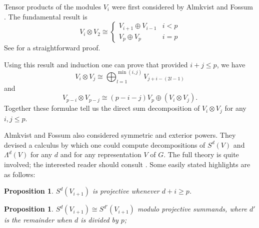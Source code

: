 \documentclass[a4paper]{amsart}
\newtheorem{Proposition}[Lemma]{Proposition}
\theoremstyle{definition}
\theoremstyle{remark}
\theoremstyle{Acknowledgments}
\begin{document}
Tensor products of the modules $V_i$ were first considered by Almkvist and Fossum \cite{AlmkvistFossum}. The fundamental result is
\begin{equation}\label{tensorbyV2} V_i \otimes V_2 \cong \left\{ \begin{array}{lr} V_{i+1} \oplus V_{i-1}&  i<p\\ V_p \oplus V_p & i=p \end{array} \right.  
\end{equation}
See \cite[Lemma~2.3.1]{BensonVecBook} for a straightforward proof. 

Using this result and induction one can prove that provided $i+j \leq p$, we have
\begin{equation}\label{tensorbyVj} V_i \otimes V_j \cong \bigoplus_{l=1}^{\min(i,j)} V_{j+i-(2l-1)}\end{equation} and
\begin{equation}\label{tensorbyVp-j} V_{p-i} \otimes V_{p-j} \cong (p-i-j) V_p \oplus (V_i \otimes V_j).\end{equation} 
Together these formulae tell us the direct sum decomposition of $V_i \otimes V_j$ for any $i,j \leq p$.

Almkvist and Fossum also considered symmetric and exterior powers. They devised a calculus by which one could compute decompositions of $S^d(V)$ and $\Lambda^d(V)$ for any $d$ and for any representation $V$ of $G$. The full theory is quite involved; the interested reader should consult \cite[Section~2.8]{BensonVecBook}. Some easily stated highlights are as follows:

\begin{Proposition}\label{projectivity} $S^d(V_{i+1})$ is projective whenever $d+i \geq p$.
\end{Proposition}  

\begin{Proposition}\label{periodicity} $S^d(V_{i+1}) \cong S^{d'}(V_{i+1})$ modulo projective summands, where $d'$ is the remainder when $d$ is divided by $p$;
\end{Proposition}  
\end{document}
